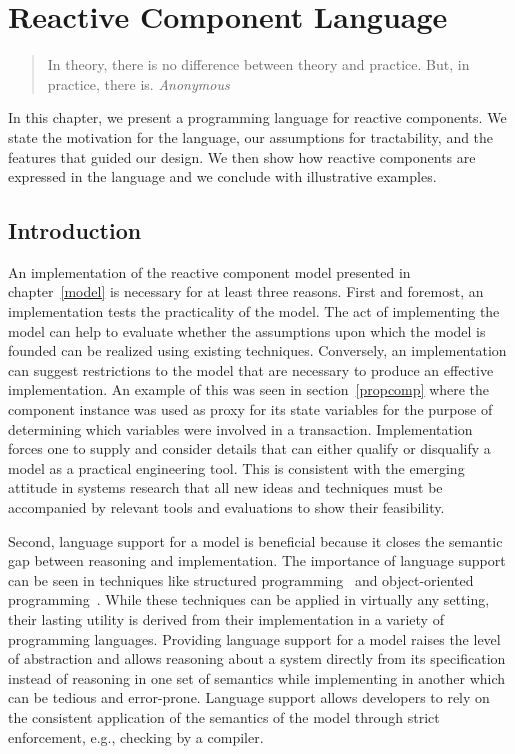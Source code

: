 \chapter{Reactive Component Language\label{language}}

\begin{quote}
In theory, there is no difference between theory and practice. \linebreak
But, in practice, there is.  \emph{Anonymous}
\end{quote}

In this chapter, we present a programming language for reactive components.
We state the motivation for the language, our assumptions for tractability, and the features that guided our design.
We then show how reactive components are expressed in the language and we conclude with illustrative examples.

\section{Introduction}

An implementation of the reactive component model presented in chapter~\ref{model} is necessary for at least three reasons.
First and foremost, an implementation tests the practicality of the model.
The act of implementing the model can help to evaluate whether the assumptions upon which the model is founded can be realized using existing techniques.
Conversely, an implementation can suggest restrictions to the model that are necessary to produce an effective implementation.
An example of this was seen in section~\ref{propcomp} where the component instance was used as proxy for its state variables for the purpose of determining which variables were involved in a transaction.
Implementation forces one to supply and consider details that can either qualify or disqualify a model as a practical engineering tool.
This is consistent with the emerging attitude in systems research that all new ideas and techniques must be accompanied by relevant tools and evaluations to show their feasibility.

Second, language support for a model is beneficial because it closes the semantic gap between reasoning and implementation.
The importance of language support can be seen in techniques like structured programming~\cite{dahl1972structured} and object-oriented programming~\cite{booch1982object}.
While these techniques can be applied in virtually any setting, their lasting utility is derived from their implementation in a variety of programming languages.
Providing language support for a model raises the level of abstraction and allows reasoning about a system directly from its specification instead of reasoning in one set of semantics while implementing in another which can be tedious and error-prone.
Language support allows developers to rely on the consistent application of the semantics of the model through strict enforcement, e.g., checking by a compiler.

